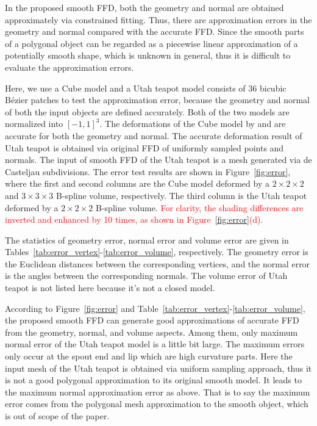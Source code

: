 \documentclass[3p]{elsarticle}
\begin{document}
In the proposed smooth FFD, both the geometry and normal are obtained approximately via constrained fitting. Thus, there
are approximation errors in the geometry and normal compared with the accurate FFD. Since the smooth parts of a
polygonal object can be regarded as a piecewise linear approximation of a potentially smooth shape, which is unknown in
general, thus it is difficult to evaluate the approximation errors.

Here, we use a Cube model and a Utah teapot model consists of 36 bicubic B\'ezier patches to test the approximation
error, because the geometry and normal of both the input objects are defined accurately. Both of the two models are
normalized into $[-1,1]^3$. The deformations of the Cube model by \cite{Cui13} and \cite{Cui14} are accurate for both
the geometry and normal. The accurate deformation result of Utah teapot is obtained via original FFD of uniformly
sampled points and normals. The input of smooth FFD of the Utah teapot is a mesh generated via de Casteljau
subdivisions. The error test results are shown in Figure~\ref{fig:error}, where the first and second columns are the
Cube model deformed by a $2\times2\times2$ and $3\times3\times3$ B-spline volume, respectively. The third column is the
Utah teapot deformed by a $2\times2\times2$ B-spline volume. \textcolor{red}{For clarity, the shading differences are
inverted and enhanced by 10 times, as shown in Figure~\ref{fig:error}(d).}

The statistics of geometry error, normal error and volume error are given in
Tables~\ref{tab:error_vertex}-\ref{tab:error_volume}, respectively. The geometry error is the Euclidean distances
between the corresponding vertices, and the normal error is the angles between the corresponding normals. The volume
error of Utah teapot is not listed here because it's not a closed model.

According to Figure~\ref{fig:error} and Table~\ref{tab:error_vertex}-\ref{tab:error_volume}, the proposed smooth FFD can
generate good approximations of accurate FFD from the geometry, normal, and volume aspects. Among them, only maximum
normal error of the Utah teapot model is a little bit large. The maximum errors only occur at the spout end and lip
which are high curvature parts. Here the input mesh of the Utah teapot is obtained via uniform sampling approach, thus
it is not a good polygonal approximation to its original smooth model. It leads to the maximum normal approximation
error as above. That is to say the maximum error comes from the polygonal mesh approximation to the smooth object, which
is out of scope of the paper. 
\end{document}
